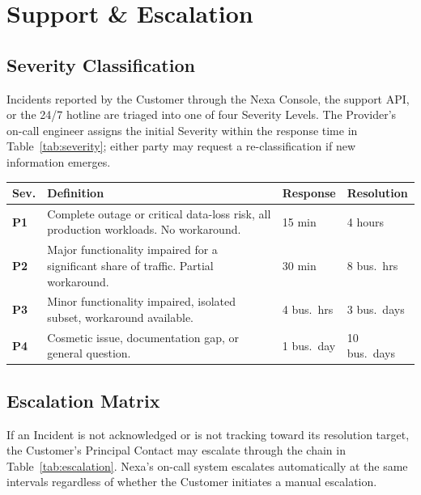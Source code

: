 
\section{Support \& Escalation}
\label{sec:support}

\subsection{Severity Classification}

Incidents reported by the Customer through the Nexa Console, the support API, or the
24/7 hotline are triaged into one of four Severity Levels. The Provider's on-call
engineer assigns the initial Severity within the response time in
Table~\ref{tab:severity}; either party may request a re-classification if new
information emerges.

\vspace{4pt}
\begin{tabularx}{\linewidth}{@{} C{0.9cm} X C{2.1cm} C{2.1cm} @{}}
  \toprule
  \textbf{Sev.} & \textbf{Definition} & \textbf{Response} & \textbf{Resolution} \\
  \midrule
  \textbf{P1} &
    Complete outage or critical data-loss risk, all production workloads. No workaround. &
    15 min & 4 hours \\
  \textbf{P2} &
    Major functionality impaired for a significant share of traffic. Partial workaround. &
    30 min & 8 bus.\ hrs \\
  \textbf{P3} &
    Minor functionality impaired, isolated subset, workaround available. &
    4 bus.\ hrs & 3 bus.\ days \\
  \textbf{P4} &
    Cosmetic issue, documentation gap, or general question. &
    1 bus.\ day & 10 bus.\ days \\
  \bottomrule
\end{tabularx}
\label{tab:severity}

\subsection{Escalation Matrix}

If an Incident is not acknowledged or is not tracking toward its resolution target, the
Customer's Principal Contact may escalate through the chain in
Table~\ref{tab:escalation}. Nexa's on-call system escalates automatically at the same
intervals regardless of whether the Customer initiates a manual escalation.

